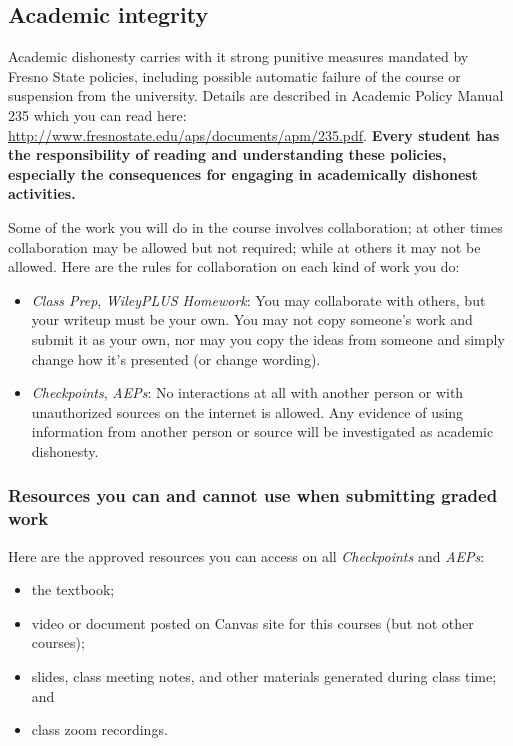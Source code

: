 \hypertarget{academic-integrity}{%
\subsection{Academic integrity}\label{academic-integrity}}

Academic dishonesty carries with it strong punitive measures mandated by
Fresno State policies, including possible automatic failure of the
course or suspension from the university. Details are described in
Academic Policy Manual 235 which you can read here:
\url{http://www.fresnostate.edu/aps/documents/apm/235.pdf}.
\textbf{Every student has the responsibility of reading and
understanding these policies, especially the consequences for engaging
in academically dishonest activities.}

Some of the work you will do in the course involves collaboration; at
other times collaboration may be allowed but not required; while at
others it may not be allowed. Here are the rules for collaboration on
each kind of work you do:

\begin{itemize}
\tightlist
\item
  \emph{Class Prep}, \emph{WileyPLUS Homework}: You may collaborate with
  others, but your writeup must be your own. You may not copy someone's
  work and submit it as your own, nor may you copy the ideas from
  someone and simply change how it's presented (or change wording).
\item
  \emph{Checkpoints}, \emph{AEPs}: No interactions at all with another
  person or with unauthorized sources on the internet is allowed. Any
  evidence of using information from another person or source will be
  investigated as academic dishonesty.
\end{itemize}

\hypertarget{resources-you-can-and-cannot-use-when-submitting-graded-work}{%
\subsubsection{Resources you can and cannot use when submitting graded
work}\label{resources-you-can-and-cannot-use-when-submitting-graded-work}}

Here are the approved resources you can access on all \emph{Checkpoints}
and \emph{AEPs}:

\begin{itemize}
\tightlist
\item
  the textbook;
\item
  video or document posted on Canvas site for this courses (but not
  other courses);
\item
  slides, class meeting notes, and other materials generated during
  class time; and
\item
  class zoom recordings.
\end{itemize}

